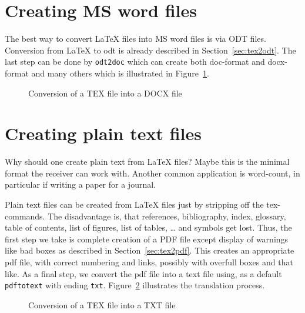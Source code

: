 \section{Creating MS word files}\label{sec:tex2doc}

The best way to convert \LaTeX{} files into MS word files is via ODT files. 
Conversion from \LaTeX{} to odt 
is already described in Section~\ref{sec:tex2odt}. 
The last step can be done by \texttt{odt2doc} which can create both 
doc-format and docx-format and many others 
which is illustrated in Figure~\ref{fig:tex2doc}. 


\begin{figure}[htb]
\centering
{}
\caption{\label{fig:tex2doc}Conversion of a TEX file into a DOCX file}
\end{figure}



\section{Creating plain text files}\label{sec:tex2txt}

Why should one create plain text from \LaTeX{} files? 
Maybe this is the minimal format the receiver can work with. 
Another common application is word-count, 
in particular if writing a paper for a journal. 

Plain text files can be created from \LaTeX{} files 
just by stripping off the tex-commands. 
The disadvantage is, 
that references, bibliography, index, glossary, 
table of contents, list of figures, list of tables, \dots 
and symbols get lost. 
Thus, the first step we take is complete creation of a PDF file 
except display of warnings like bad boxes 
as described in Section~\ref{sec:tex2pdf}. 
This creates an appropriate pdf file, 
with correct numbering and links, 
possibly with overfull boxes and that like. 
As a final step, we convert the pdf file into a text file 
using, as a default \texttt{pdftotext} with ending \texttt{txt}. 
Figure~\ref{fig:tex2txt} illustrates the translation process. 

\begin{figure}[htb]
\centering
{}
\caption{\label{fig:tex2txt}Conversion of a TEX file into a TXT file}
\end{figure}


